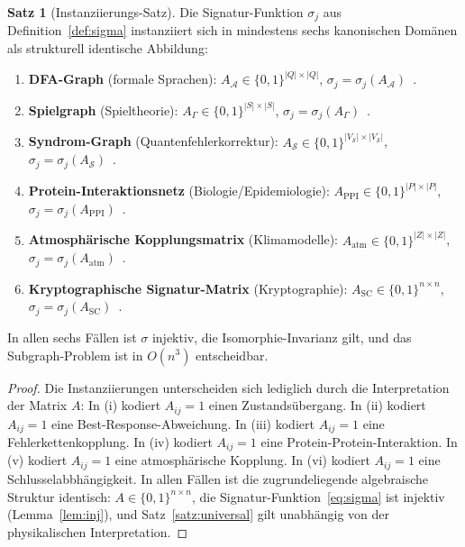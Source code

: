 ﻿\documentclass[a4paper,12pt]{article}
\theoremstyle{definition}
\newtheorem{satz}{Satz}
\begin{document}
\begin{satz}[Instanziierungs-Satz]
\label{satz:instanz}
Die Signatur-Funktion $\sigma_j$ aus Definition~\ref{def:sigma}
instanziiert sich in mindestens sechs kanonischen Domänen als
strukturell identische Abbildung:
\begin{enumerate}[label=(\roman*)]
    \item \textbf{DFA-Graph} (formale Sprachen):
          $A_{\mathcal{A}} \in \{0,1\}^{|Q|\times|Q|}$,
          $\sigma_j = \sigma_j(A_{\mathcal{A}})$~\cite{epp2026grammatik}.
    \item \textbf{Spielgraph} (Spieltheorie):
          $A_\Gamma \in \{0,1\}^{|S|\times|S|}$,
          $\sigma_j = \sigma_j(A_\Gamma)$~\cite{epp2026spieltheorie}.
    \item \textbf{Syndrom-Graph} (Quantenfehlerkorrektur):
          $A_{\mathcal{S}} \in \{0,1\}^{|V_{\mathcal{S}}|\times|V_{\mathcal{S}}|}$,
          $\sigma_j = \sigma_j(A_{\mathcal{S}})$~\cite{epp2026qecc}.
    \item \textbf{Protein-Interaktionsnetz} (Biologie/Epidemiologie):
          $A_{\mathrm{PPI}} \in \{0,1\}^{|P|\times|P|}$,
          $\sigma_j = \sigma_j(A_{\mathrm{PPI}})$~\cite{epp2026gen}.
    \item \textbf{Atmosphärische Kopplungsmatrix} (Klimamodelle):
          $A_{\mathrm{atm}} \in \{0,1\}^{|Z|\times|Z|}$,
          $\sigma_j = \sigma_j(A_{\mathrm{atm}})$~\cite{epp2026klima}.
    \item \textbf{Kryptographische Signatur-Matrix} (Kryptographie):
          $A_{\mathrm{SC}} \in \{0,1\}^{n\times n}$,
          $\sigma_j = \sigma_j(A_{\mathrm{SC}})$~\cite{epp2026sigchiffre}.
\end{enumerate}
In allen sechs F\"allen ist $\sigma$ injektiv, die Isomorphie-Invarianz
gilt, und das Subgraph-Problem ist in $O(n^3)$ entscheidbar.
\end{satz}

\begin{proof}
Die Instanziierungen unterscheiden sich lediglich durch die Interpretation
der Matrix $A$:
In (i) kodiert $A_{ij} = 1$ einen Zustandsübergang.
In (ii) kodiert $A_{ij} = 1$ eine Best-Response-Abweichung.
In (iii) kodiert $A_{ij} = 1$ eine Fehlerkettenkopplung.
In (iv) kodiert $A_{ij} = 1$ eine Protein-Protein-Interaktion.
In (v) kodiert $A_{ij} = 1$ eine atmosph\"arische Kopplung.
In (vi) kodiert $A_{ij} = 1$ eine Schlusselabbh\"angigkeit.
In allen F\"allen ist die zugrundeliegende algebraische Struktur identisch:
$A \in \{0,1\}^{n\times n}$, die Signatur-Funktion~\eqref{eq:sigma}
ist injektiv (Lemma~\ref{lem:inj}), und Satz~\ref{satz:universal}
gilt unabh\"angig von der physikalischen Interpretation.
\end{proof}
\end{document}
